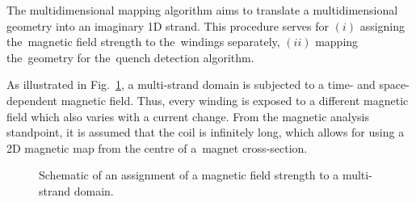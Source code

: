 
The multidimensional mapping algorithm aims to translate a multidimensional geometry into an imaginary 1D strand. This procedure serves for $(i)$ assigning the~magnetic field strength to the~windings separately, $(ii)$ mapping the~geometry for the~quench detection algorithm. 

As illustrated in Fig.~\ref{fig: 3d_coil_illustation_with_2d_b_field}, a multi-strand domain is subjected to a time- and space-dependent magnetic field. Thus, every winding is exposed to a different magnetic field which also varies with a current change. From the magnetic analysis standpoint, it is assumed that the coil is infinitely long, which allows for using a 2D magnetic map from the centre of a~magnet cross-section.

\begin{figure}[H]
    \centering
    \caption{Schematic of an assignment of a magnetic field strength to a multi-strand domain.}
    \label{fig: 3d_coil_illustation_with_2d_b_field}
\end{figure}


